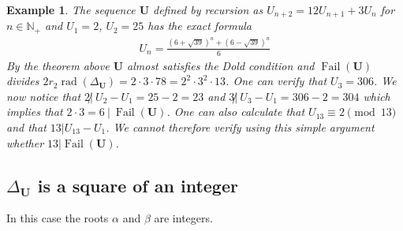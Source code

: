 \documentclass[preprint,12pt]{elsarticle}
\newcommand{\N}{\mathbb{N}}
\DeclareMathOperator{\rad}{rad}
\DeclareMathOperator{\fail}{Fail}
\newtheorem{example}{Example}
\begin{document}
\begin{example}
    The sequence $\mathbf{U}$ defined by recursion as $U_{n+2} = 12U_{n+1}+3U_n$ for $n\in \N_+$ and $U_1 = 2$, $U_2 = 25$ has the exact formula 
    \begin{align}
        U_n = \frac{\left(6+\sqrt{39}\right)^n+\left(6-\sqrt{39}\right)^n}{6}
    \end{align}
    By the theorem above $\mathbf{U}$ almost satisfies the Dold condition and $\fail(\mathbf{U})$ divides $2r_2\rad(\Delta_\mathbf{U}) = 2\cdot 3\cdot 78 = 2^2\cdot 3^2\cdot13$. One can verify that $U_3 = 306$. We now notice that $2\not|\ U_2-U_1 = 25-2 = 23$ and $3\not|\ U_3-U_1 = 306-2 = 304$ which implies that $2\cdot 3=6\ |\ \fail(\mathbf{U})$. One can also calculate that $U_{13} \equiv 2 \pmod 13$ and that $13|U_{13}-U_1$. We cannot therefore verify using this simple argument whether $13|\fail(\mathbf{U})$.   
\end{example}











\subsection{$\Delta_{\mathbf U}$ is a square of an integer}

In this case the roots $\alpha$ and $\beta$ are integers. 
\end{document}
